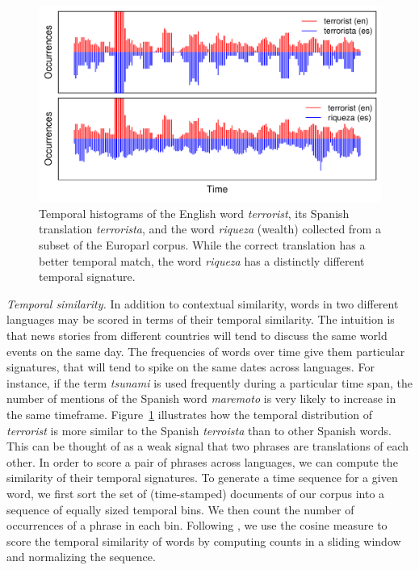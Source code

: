 \documentclass[11pt]{article}
\newcommand{\mnote}[1]{\marginpar{%
  \vskip-\baselineskip
  \raggedright\footnotesize
  \itshape\hrule\smallskip\tiny{#1}\par\smallskip\hrule}}
\newcommand{\mtodo}[1]{\mnote{\textcolor{red}{#1}}}
\newcommand{\figref}[1]{Figure~\ref{#1}}
\newcommand{\paraheader}[1]{\vskip 0.05in \noindent\emph{#1}}
\begin{document}
\mtodo{Give an example Spanish phrase and the English phrases that it has the highest similarity with}

\begin{figure}[t]
\includegraphics[width= \linewidth]{../figures/temporal/temporal}
\caption{Temporal histograms of the English word {\em terrorist}, its Spanish translation {\em terrorista}, and the word {\em riqueza} (wealth) collected from a subset of the Europarl corpus. While the correct translation has a better temporal match, the word {\em riqueza} has a distinctly different temporal signature.}
\label{fig:temporal}
\end{figure}

\paraheader{Temporal similarity.} In addition to contextual similarity, words in two different languages may be scored in terms of their temporal similarity.  The intuition is that news stories from different countries will tend to discuss the same world events on the same day.  The frequencies of words over time give them particular signatures, that will tend to spike on the same dates across languages.  For instance, if the term {\it tsunami} is used frequently during a particular time span, the number of mentions of the Spanish word {\it maremoto} is very likely to increase in the same timeframe.  \figref{fig:temporal} illustrates how the temporal distribution of {\it terrorist} is more similar to the Spanish {\it terroista} than to other Spanish words.  This can be thought of as a weak signal that two phrases are translations of each other.  In order to score a pair of phrases across languages, we can compute the similarity of their temporal signatures. To generate a time sequence for a given word, we first sort the set of (time-stamped) documents of our corpus into a sequence of equally sized temporal bins.  We then count the number of occurrences of a phrase in each bin.  Following , we use the cosine measure to score the temporal similarity of words by computing counts in a sliding window and normalizing the sequence. 
\end{document}
